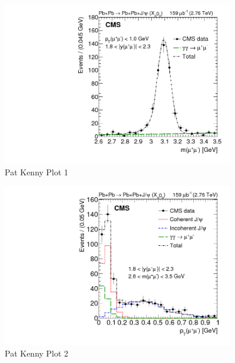 \begin{figure}[h!]
\begin{centering}
\includegraphics[width=4in]{Chapter2/importfigs/patkenny_Figure_001-a.png}
\par\end{centering}
\caption{Pat Kenny Plot 1 \label{fig:pk3}}
\end{figure}


\begin{figure}[h!]
\begin{centering}
\includegraphics[width=4in]{Chapter2/importfigs/patkenny_Figure_001-b.png}
\par\end{centering}
\caption{Pat Kenny Plot 2 \label{fig:pk2}}
\end{figure}


